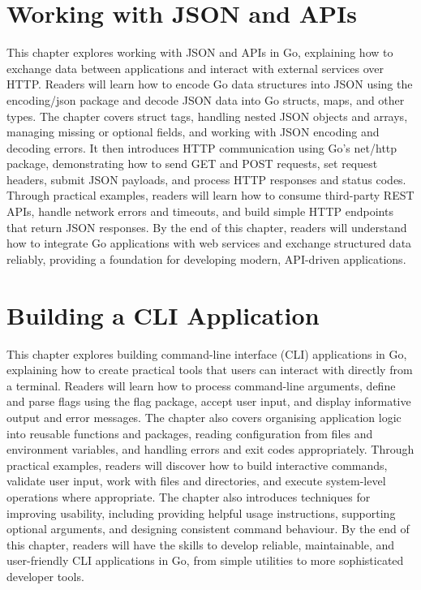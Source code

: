 \documentclass[12pt,oneside]{book}
\begin{document}
\chapter{Working with JSON and APIs}
\begin{chaptersummary}
This chapter explores working with JSON and APIs in Go, explaining how to exchange data between applications and interact with external services over HTTP. Readers will learn how to encode Go data structures into JSON using the encoding/json package and decode JSON data into Go structs, maps, and other types. The chapter covers struct tags, handling nested JSON objects and arrays, managing missing or optional fields, and working with JSON encoding and decoding errors. It then introduces HTTP communication using Go’s net/http package, demonstrating how to send GET and POST requests, set request headers, submit JSON payloads, and process HTTP responses and status codes. Through practical examples, readers will learn how to consume third-party REST APIs, handle network errors and timeouts, and build simple HTTP endpoints that return JSON responses. By the end of this chapter, readers will understand how to integrate Go applications with web services and exchange structured data reliably, providing a foundation for developing modern, API-driven applications.
\end{chaptersummary}


\chapter{Building a CLI Application}
\begin{chaptersummary}
This chapter explores building command-line interface (CLI) applications in Go, explaining how to create practical tools that users can interact with directly from a terminal. Readers will learn how to process command-line arguments, define and parse flags using the flag package, accept user input, and display informative output and error messages. The chapter also covers organising application logic into reusable functions and packages, reading configuration from files and environment variables, and handling errors and exit codes appropriately. Through practical examples, readers will discover how to build interactive commands, validate user input, work with files and directories, and execute system-level operations where appropriate. The chapter also introduces techniques for improving usability, including providing helpful usage instructions, supporting optional arguments, and designing consistent command behaviour. By the end of this chapter, readers will have the skills to develop reliable, maintainable, and user-friendly CLI applications in Go, from simple utilities to more sophisticated developer tools.
\end{chaptersummary}

\end{document}
